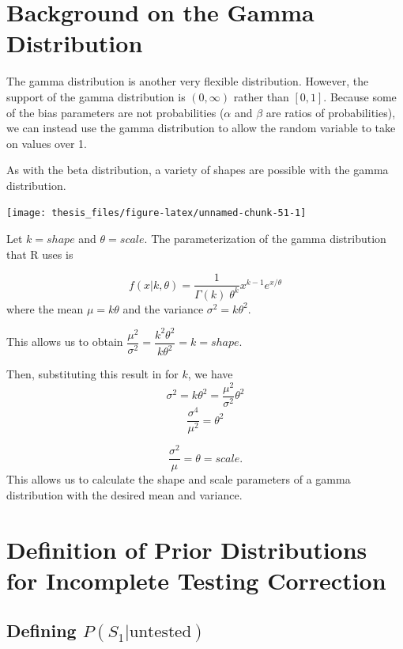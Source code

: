 \documentclass[12pt,twoside]{smiththesis}
\begin{document}
\hypertarget{background-on-the-gamma-distribution}{%
\section{Background on the Gamma Distribution}\label{background-on-the-gamma-distribution}}

The gamma distribution is another very flexible distribution. However, the support of the gamma distribution is \((0,\infty)\) rather than \([0,1]\). Because some of the bias parameters are not probabilities (\(\alpha\) and \(\beta\) are ratios of probabilities), we can instead use the gamma distribution to allow the random variable to take on values over 1.

As with the beta distribution, a variety of shapes are possible with the gamma distribution.
\begin{center}\texttt{[image: thesis\_files/figure-latex/unnamed-chunk-51-1]} \end{center}

Let \(k=shape\) and \(\theta=scale\). The parameterization of the gamma distribution that R uses is

\[f(x|k,\theta) = \frac{1}{\Gamma(k) \;\theta^k}x^{k-1} e^{x/\theta}\]
where the mean \(\mu =k\theta\) and the variance \(\sigma^2 = k\theta^2\).

This allows us to obtain \(\dfrac{\mu^2}{\sigma^2} = \dfrac{k^2 \theta^2}{k\theta^2} = k =shape\).

Then, substituting this result in for \(k\), we have \[\sigma^2 = k \theta^2 = \dfrac{\mu^2}{\sigma^2} \theta^2\]
\[\frac{\sigma^4}{\mu^2}=\theta^2\]

\[\frac{\sigma^2}{\mu}=\theta = scale.\]
This allows us to calculate the shape and scale parameters of a gamma distribution with the desired mean and variance.

\hypertarget{definition-of-prior-distributions-for-incomplete-testing-correction}{%
\section{Definition of Prior Distributions for Incomplete Testing Correction}\label{definition-of-prior-distributions-for-incomplete-testing-correction}}

\hypertarget{defining-ps_1textuntested}{%
\subsection{\texorpdfstring{Defining \(P(S_1|\text{untested})\)}{Defining P(S\_1\textbar\textbackslash text\{untested\})}}\label{defining-ps_1textuntested}}
\end{document}
